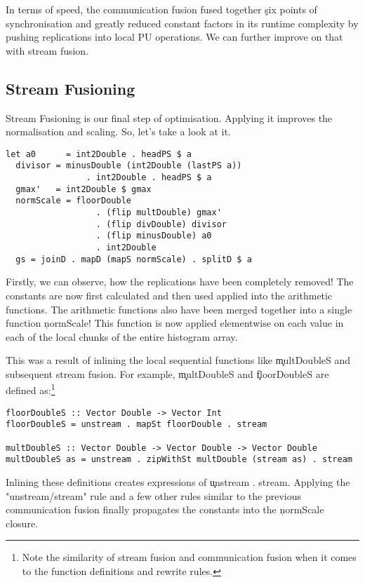     
    In terms of speed, the communication fusion fused together \c{six} points of synchronisation
    and greatly reduced constant factors in its runtime complexity by pushing
    replications into local PU operations. We can further improve on that with stream fusion.
    
  \subsection{Stream Fusioning}
    Stream Fusioning is our final step of optimisation. Applying it improves
    the normalisation and scaling. So, let's take a look at it.
    \begin{lstlisting}
let a0      = int2Double . headPS $ a 
  divisor = minusDouble (int2Double (lastPS a))
                . int2Double . headPS $ a
  gmax'   = int2Double $ gmax
  normScale = floorDouble
                  . (flip multDouble) gmax'
                  . (flip divDouble) divisor
                  . (flip minusDouble) a0
                  . int2Double
  gs = joinD . mapD (mapS normScale) . splitD $ a
     \end{lstlisting}
     Firstly, we can observe, how the replications have been completely removed! The
     constants are now first calculated and then used applied into the
     arithmetic functions. The arithmetic functions also have been merged together into
     a single function \c{normScale}! This function is now applied elementwise
     on each value in each of the local chunks of the entire histogram array.
     
     This was a result of inlining the local sequential functions like \c{multDoubleS}
     and subsequent stream fusion. For example, \c{multDoubleS} and \c{floorDoubleS} are defined as:\footnote{Note the similarity of stream fusion and communication fusion when it comes to the function definitions and rewrite rules.}
     \begin{lstlisting}
floorDoubleS :: Vector Double -> Vector Int
floorDoubleS = unstream . mapSt floorDouble . stream

multDoubleS :: Vector Double -> Vector Double -> Vector Double
multDoubleS as = unstream . zipWithSt multDouble (stream as) . stream
     \end{lstlisting}
     Inlining these definitions creates expressions of \c{unstream . stream}. Applying
     the "unstream/stream" rule and a few other rules similar to the previous
     communication fusion finally propagates the constants into the
     \c{normScale} closure.
     
